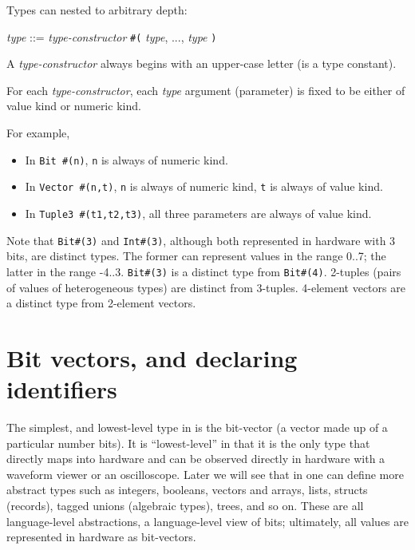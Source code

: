Types can nested to arbitrary depth:

\begin{tabbing}
 \hmmmm \emph{type} ::= \emph{type-constructor} {\tt \#(} \emph{type}, ..., \emph{type} {\tt )}
\end{tabbing}

A \emph{type-constructor} always begins with an upper-case letter (is a type constant).

For each \emph{type-constructor}, each \emph{type} argument
(parameter) is fixed to be either of value kind or numeric kind.

For example,

\begin{itemize}

 \item In \verb|Bit #(n)|, \verb|n| is always of numeric kind.

 \item In \verb|Vector #(n,t)|, \verb|n| is always of numeric kind,
 \verb|t| is always of value kind.

 \item In \verb|Tuple3 #(t1,t2,t3)|, all three parameters are always of value kind.

\end{itemize}

Note that \verb|Bit#(3)| and \verb|Int#(3)|, although both represented
in hardware with 3 bits, are distinct types.  The former can represent
values in the range 0..7; the latter in the range -4..3.
\verb|Bit#(3)| is a distinct type from \verb|Bit#(4)|.  2-tuples
(pairs of values of heterogeneous types) are distinct from 3-tuples.
4-element vectors are a distinct type from 2-element vectors.


\section{Bit vectors, and declaring identifiers}

\label{Sec_BSV_Bit_Vectors}


The simplest, and lowest-level type in {\BSV} is the bit-vector (a vector
made up of a particular number bits).  It is ``lowest-level'' in that
it is the only type that directly maps into hardware and can be
observed directly in hardware with a waveform viewer or an
oscilloscope.  Later we will see that in {\BSV} one can define more
abstract types such as integers, booleans, vectors and arrays, lists,
structs (records), tagged unions (algebraic types), trees, and so on.
These are all language-level abstractions, {\ie} a language-level view
of bits; ultimately, all values are represented in hardware as
bit-vectors.

